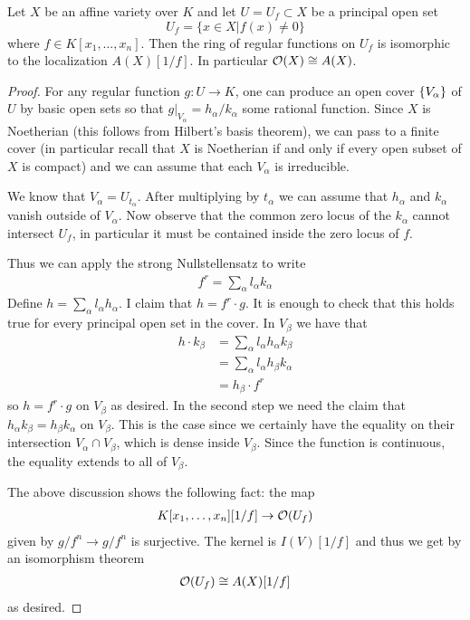 \documentclass[12pt]{article}
\begin{document}
\begin{lemma}
Let $X$ be an affine variety over $K$ and let $U = U_f\subset X$ be a principal open set \[U_f = \{x\in X \vert f(x)\neq 0\}\] where $f\in K[x_1,\dots,x_n]$. Then the ring of regular functions on $U_f$ is isomorphic to the localization $A(X)[1/f]$. In particular $\mathcal{O}(X)\cong A(X)$.
\end{lemma}

\begin{proof}
For any regular function $g:U\to K$, one can produce an open cover $\{V_\alpha\}$ of $U$ by basic open sets so that $g\vert_{V_\alpha} = h_\alpha/k_\alpha$ some rational function. Since $X$ is Noetherian (this follows from Hilbert's basis theorem), we can pass to a finite cover (in particular recall that $X$ is Noetherian if and only if every open subset of $X$ is compact) and we can assume that each $V_\alpha$ is irreducible.

\hfill 

We know that $V_\alpha = U_{t_\alpha}$. After multiplying by $t_\alpha$ we can assume that $h_\alpha$ and $k_\alpha$ vanish outside of $V_\alpha$. Now observe that the common zero locus of the $k_\alpha$ cannot intersect $U_f$, in particular it must be contained inside the zero locus of $f$.

\hfill

Thus we can apply the strong Nullstellensatz to write \begin{align*}
    f^r = \sum_\alpha l_\alpha k_\alpha
\end{align*}
Define $h = \sum_\alpha l_\alpha h_\alpha$. I claim that $h = f^r\cdot g$. It is enough to check that this holds true for every principal open set in the cover. In $V_\beta$ we have that \begin{align*}
    h\cdot k_\beta &= \sum_\alpha l_\alpha h_\alpha k_\beta\\
    &= \sum_\alpha l_\alpha h_\beta k_\alpha\\
    &= h_\beta\cdot f^r
\end{align*} so $h = f^r \cdot g$ on $V_\beta$ as desired. In the second step we need the claim that $h_\alpha k_\beta = h_\beta k_\alpha$ on $V_\beta$. This is the case since we certainly have the equality on their intersection $V_\alpha \cap V_\beta$, which is dense inside $V_\beta$. Since the function is continuous, the equality extends to all of $V_\beta$.

\hfill 

The above discussion shows the following fact: the map \begin{align*}
    K[x_1,\dots,x_n][1/f]\to \mathcal{O}(U_f)
\end{align*} given by $g/f^n\to g/f^n$ is surjective. The kernel is $I(V)[1/f]$ and thus we get by an isomorphism theorem\begin{align*}
    \mathcal{O}(U_f) \cong A(X)[1/f]
\end{align*} as desired.
\end{proof}
\end{document}
